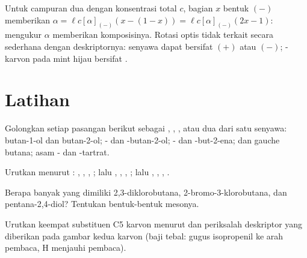 Untuk campuran dua  dengan konsentrasi total $c$, bagian $x$
bentuk $(-)$ memberikan $\alpha = \ell c[\alpha]_{(-)}(x - (1 - x)) =
\ell c[\alpha]_{(-)}(2x - 1)$: mengukur $\alpha$ memberikan komposisinya.
Rotasi optis tidak terkait secara sederhana dengan deskriptornya:
senyawa  dapat bersifat $(+)$ atau $(-)$; -karvon pada
mint hijau bersifat .

\section{Latihan}

\begin{exercise}[$\star$]\label{exo:b1:stereochemistry-in-depth:1}
Golongkan setiap pasangan berikut sebagai , ,
, atau dua  dari satu senyawa: butan-1-ol dan
butan-2-ol; - dan -butan-2-ol; - dan
-but-2-ena;  dan gauche butana; asam - dan
-tartrat.
\end{exercise}

\begin{exercise}[$\star$]\label{exo:b1:stereochemistry-in-depth:2}
Urutkan menurut : , , , ;
lalu , , , ; lalu ,
, , .
\end{exercise}

\begin{exercise}[$\star$]\label{exo:b1:stereochemistry-in-depth:3}
Berapa banyak  yang dimiliki 2,3-diklorobutana,
2-bromo-3-klorobutana, dan pentana-2,4-diol? Tentukan bentuk-bentuk
mesonya.
\end{exercise}

\begin{exercise}[$\star$]\label{exo:b1:stereochemistry-in-depth:4}
Urutkan keempat substituen C5 karvon menurut  dan periksalah
deskriptor yang diberikan pada gambar kedua karvon (baji tebal: gugus
isopropenil ke arah pembaca, H menjauhi pembaca).
\end{exercise}

